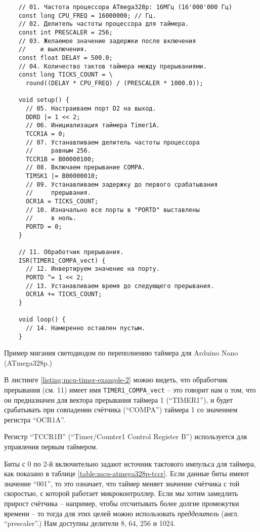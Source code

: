 \documentclass[../sparc.tex]{subfiles}
\begin{document}
\begin{listing}[H]
  \begin{verbatim}
    // 01. Частота процессора ATmega328p: 16МГц (16'000'000 Гц)
    const long CPU_FREQ = 16000000; // Гц.
    // 02. Делитель частоты процессора для таймера.
    const int PRESCALER = 256;
    // 03. Желаемое значение задержки после включения
    //    и выключения.
    const float DELAY = 500.0;
    // 04. Количество тактов таймера между прерываниями.
    const long TICKS_COUNT = \
      round((DELAY * CPU_FREQ) / (PRESCALER * 1000.0));

    void setup() {
      // 05. Настраиваем порт D2 на выход.
      DDRD |= 1 << 2;
      // 06. Инициализация таймера Timer1A.
      TCCR1A = 0;
      // 07. Устанавливаем делитель частоты процессора
      //     равным 256.
      TCCR1B = B00000100;
      // 08. Включаем прерывание COMPA.
      TIMSK1 |= B00000010;
      // 09. Устанавливаем задержку до первого срабатывания
      //     прерывания.
      OCR1A = TICKS_COUNT;
      // 10. Изначально все порты в "PORTD" выставлены
      //     в ноль.
      PORTD = 0;
    }

    // 11. Обработчик прерывания.
    ISR(TIMER1_COMPA_vect) {
      // 12. Инвертируем значение на порту.
      PORTD ^= 1 << 2;
      // 13. Устанавливаем время до следующего прерывания.
      OCR1A += TICKS_COUNT;
    }

    void loop() {
      // 14. Намеренно оставлен пустым.
    }
  \end{verbatim}
  \caption{Пример мигания светодиодом по переполнению таймера для Arduino Nano
    (ATmega328p.)}
  \label{listing:mcu-timer-example-2}
\end{listing}

В листинге \ref{listing:mcu-timer-example-2} можно видеть, что обработчик
прерывания (см. 11) имеет имя \texttt{TIMER1_COMPA_vect} -- это говорит
нам о том, что он предназначен для вектора прерывания таймера 1 (``TIMER1''), и
будет срабатывать при совпадении счётчика (``COMPA'') таймера 1 со значением
регистра ``OCR1A''.


Регистр ``TCCR1B'' (``Timer/Counter1 Control Register B'') используется для
управления первым таймером.


Биты с 0 по 2-й включительно задают источник тактового импульса для таймера, как
показано в таблице \ref{table:mcu-atmega328p-tccr}.  Если данные биты имеют
значение ``001'', то это означает, что таймер меняет значение счётчика с той
скоростью, с которой работает микроконтроллер.  Если мы хотим замедлить прирост
счётчика -- например, чтобы отсчитывать более долгие промежутки времени -- то
тогда для этих целей можно использовать \emph{предделитель}
(англ. ``prescaler''.)  Нам доступны делители 8, 64, 256 и 1024.
\end{document}
